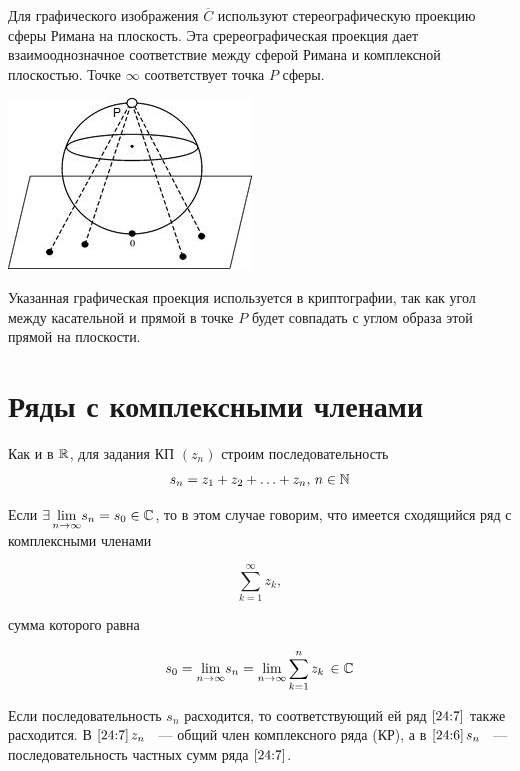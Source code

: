\documentclass[../../main.tex]{subfiles}
\begin{document}
Для графического изображения $ \overline{C} $ используют стереографическую 
проекцию сферы Римана на плоскость. Эта сререографическая проекция дает 
взаимооднозначное соответствие между сферой Римана и комплексной плоскостью. 
Точке $ \infty $ соответствует точка $P$ сферы.

\begin{center}
	\includegraphics[scale = 0.8]{lec24_1} 
\end{center}

Указанная графическая проекция используется в криптографии, так как угол между 
касательной и прямой в точке $ P $ будет совпадать с углом образа этой прямой 
на плоскости.

\section{Ряды с комплексными членами}

Как и в $ \mathbb{R} $, для задания КП $ (z_n) $ строим последовательность 
\begin{equation}\label{24:6}
	s_n = z_1 + z_2 + \ldots + z_n,\, n \in \mathbb{N}
\end{equation}

Если $ \exists\, \underset{n \to \infty}{\lim} s_n = s_0 \in \mathbb{C} $, то в этом 
случае говорим, что имеется сходящийся ряд с комплексными членами

\begin{equation}\label{24:7}
	\sum_{k=1}^{\infty}z_k,
\end{equation}

сумма которого равна

\begin{equation}\label{24:8}
	s_0 = \underset{n \to \infty}{\lim} s_n = \underset{n \to \infty}{\lim} 
	\sum_{k=1}^{n}z_k\, \in \mathbb{C}
\end{equation}

Если последовательность $ s_n $ расходится, то соответствующий ей ряд $ 
\eqref{24:7} $ также расходится. В $ \eqref{24:7}\, z_n $ ~--- общий член 
комплексного ряда (КР), а в $ \eqref{24:6}\, s_n $ ~--- последовательность 
частных сумм ряда $ \eqref{24:7} $.
\end{document}
